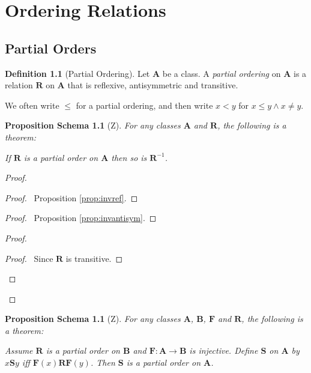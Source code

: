 \documentclass{book}
\let\qed\relax
\newtheorem{props}[ax]{Proposition Schema}
\theoremstyle{definition}
\newtheorem{df}[ax]{Definition}
\begin{document}
\chapter{Ordering Relations}

\section{Partial Orders}

\begin{df}[Partial Ordering]
Let $\mathbf{A}$ be a class. A \emph{partial ordering} on $\mathbf{A}$ is a relation $\mathbf{R}$ on $\mathbf{A}$ that is reflexive, antisymmetric and transitive.

We often write $\leq$ for a partial ordering, and then write $x < y$ for $x \leq y \wedge x \neq y$.
\end{df}

\begin{props}[Z]
\label{prop:invposet}
For any classes $\mathbf{A}$ and $\mathbf{R}$, the following is a theorem:

If $\mathbf{R}$ is a partial order on $\mathbf{A}$ then so is $\mathbf{R}^{-1}$.
\end{props}

\begin{proof}
\pf
{}
\begin{proof}
	\pf\ Proposition \ref{prop:invref}.
\end{proof}
\begin{proof}
	\pf\ Proposition \ref{prop:invantisym}.
\end{proof}
\begin{proof}
	\begin{proof}
		\pf\ Since $\mathbf{R}$ is transitive.
	\end{proof}
\end{proof}
\qed
\end{proof}

\begin{props}[Z]
\label{prop:subposet}
For any classes $\mathbf{A}$, $\mathbf{B}$, $\mathbf{F}$ and $\mathbf{R}$, the following is a theorem:

Assume $\mathbf{R}$ is a partial order on $\mathbf{B}$ and $\mathbf{F} : \mathbf{A} \rightarrow \mathbf{B}$ is injective. Define $\mathbf{S}$ on $\mathbf{A}$ by $x \mathbf{S} y$ iff $\mathbf{F}(x) \mathbf{R} \mathbf{F}(y)$. Then $\mathbf{S}$ is a partial order on $\mathbf{A}$.
\end{props}
\end{document}
